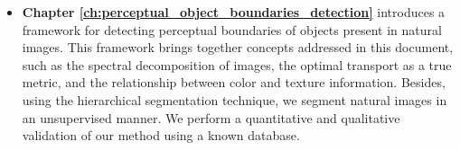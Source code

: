 \begin{itemize}
	\item \textbf{Chapter \ref{ch:perceptual_object_boundaries_detection}} introduces a framework for detecting perceptual boundaries of objects present in natural images. This framework brings together concepts addressed in this document, such as the spectral decomposition of images, the optimal transport as a true metric, and the relationship between color and texture information. Besides, using the hierarchical segmentation technique, we segment natural images in an unsupervised manner. We perform a quantitative and qualitative validation of our method using a known database.
	
	
\end{itemize}